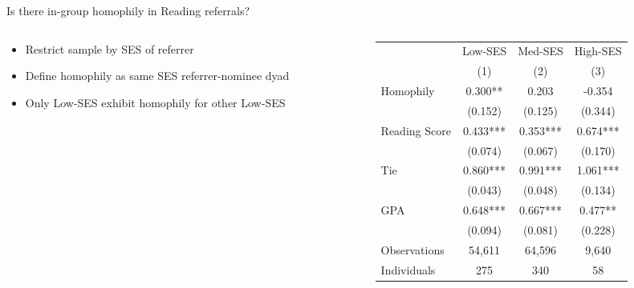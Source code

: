 \documentclass[aspectratio=169,xcolor=dvipsnames]{beamer}
\begin{document}
\begin{frame}{Is there in-group homophily in Reading referrals?}
    \begin{columns}[T]
        \begin{column}{0.38\textwidth}
            \vspace{2em}
            \begin{itemize}
                \item Restrict sample by SES of referrer
                \item Define homophily as same SES referrer-nominee dyad
                \item Only Low-SES exhibit homophily for other Low-SES
            \end{itemize}
        \end{column}
        \begin{column}{0.62\textwidth}
            \begin{table}
                \centering
                \footnotesize
                \begin{threeparttable}
                \begin{tabular*}{0.9\columnwidth}{@{\extracolsep{\fill}}lccc}
                \toprule
                & Low-SES & Med-SES & High-SES \\
                 & \multicolumn{1}{c}{(1)} & \multicolumn{1}{c}{(2)} & \multicolumn{1}{c}{(3)} \\
                \midrule
                Homophily & 0.300** & 0.203 & -0.354 \\
                 & (0.152) & (0.125) & (0.344) \\
                Reading Score  & 0.433*** & 0.353*** & 0.674*** \\
                 & (0.074) & (0.067) & (0.170) \\
                Tie & 0.860*** & 0.991*** & 1.061*** \\
                 & (0.043) & (0.048) & (0.134) \\
                GPA & 0.648*** & 0.667*** & 0.477** \\
                 & (0.094) & (0.081) & (0.228) \\
                \midrule
                Observations & 54,611 & 64,596 & 9,640 \\
                Individuals & 275 & 340 & 58 \\
                \bottomrule
                \end{tabular*}
                \label{tab:homophily_reading}
                \end{threeparttable}
            \end{table}
        \end{column}
    \end{columns}
\end{frame}
\end{document}
